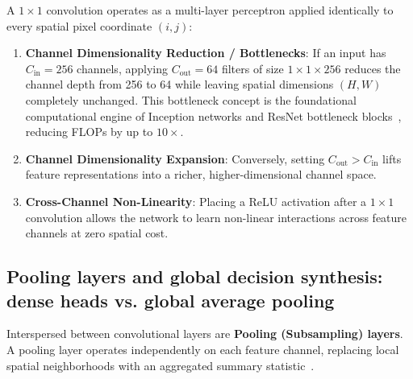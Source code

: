 A $1 \times 1$ convolution operates as a multi-layer perceptron applied identically to every spatial pixel coordinate $(i, j)$:
\begin{enumerate}
  \item \textbf{Channel Dimensionality Reduction / Bottlenecks}: If an input has $C_{\text{in}} = 256$ channels, applying $C_{\text{out}} = 64$ filters of size $1 \times 1 \times 256$ reduces the channel depth from 256 to 64 while leaving spatial dimensions $(H, W)$ completely unchanged. This bottleneck concept is the foundational computational engine of Inception networks and ResNet bottleneck blocks~\cite{he2016deep}, reducing FLOPs by up to $10\times$.
  \item \textbf{Channel Dimensionality Expansion}: Conversely, setting $C_{\text{out}} > C_{\text{in}}$ lifts feature representations into a richer, higher-dimensional channel space.
  \item \textbf{Cross-Channel Non-Linearity}: Placing a ReLU activation after a $1 \times 1$ convolution allows the network to learn non-linear interactions across feature channels at zero spatial cost.
\end{enumerate}

\subsection{Pooling layers and global decision synthesis: dense heads vs. global average pooling}
\label{sec:pooling_and_decision_synthesis}
\label{sec:pooling_layers}

Interspersed between convolutional layers are \textbf{Pooling (Subsampling) layers}. A pooling layer operates independently on each feature channel, replacing local spatial neighborhoods with an aggregated summary statistic~\cite{goodfellow2016deep}.

